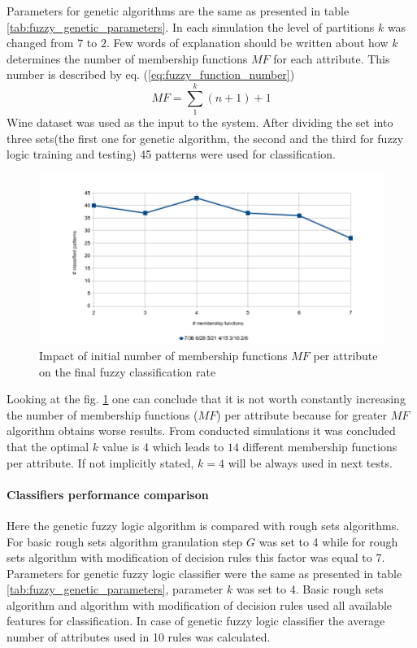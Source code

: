 Parameters for genetic algorithms are the same as presented in table \ref{tab:fuzzy_genetic_parameters}. 
In each simulation the level of partitions $k$ was changed from $7$ to $2$. Few words of explanation should be
written about how $k$ determines the number of membership functions $MF$ for each
attribute. This number is described by eq. (\ref{eq:fuzzy_function_number})
\begin{equation}
    MF = \sum\limits_1^k (n + 1) + 1
    \label{eq:fuzzy_function_number}
\end{equation}
Wine dataset was used as the input to the system. After dividing the set into
three sets(the first one for genetic algorithm, the second and the third for
fuzzy logic training and testing) 45 patterns were used for classification. 

\begin{figure}[H]
    \begin{center}
        \includegraphics[width=\textwidth]{fig/fuzzy_functions.png}
    \end{center}
    \caption{Impact of initial number of membership functions $MF$ per attribute on
    the final fuzzy classification rate}
    \label{fig:fuzzy_functions}
\end{figure}
Looking at the fig. \ref{fig:fuzzy_functions} one can conclude that it is not
worth constantly increasing the number of membership functions ($MF$) per attribute
because for greater $MF$ algorithm obtains worse results. From conducted simulations 
it was concluded that the optimal $k$ value is 4 which leads to $14$
different membership functions per attribute. If not implicitly stated, $k=4$
will be always used in next tests.

\paragraph{Classifiers performance comparison}
Here the genetic fuzzy logic algorithm is compared with rough sets algorithms.
For basic rough sets algorithm granulation step $G$ was set to 4 while for
rough sets algorithm with modification of decision rules this factor was equal
to 7. Parameters for genetic fuzzy logic classifier were the same as presented
in table \ref{tab:fuzzy_genetic_parameters}, parameter $k$ was set to 4. Basic
rough sets algorithm and algorithm with modification of decision rules used all
available features for classification. In case of genetic fuzzy logic
classifier the average number of attributes used in 10 rules was calculated.

